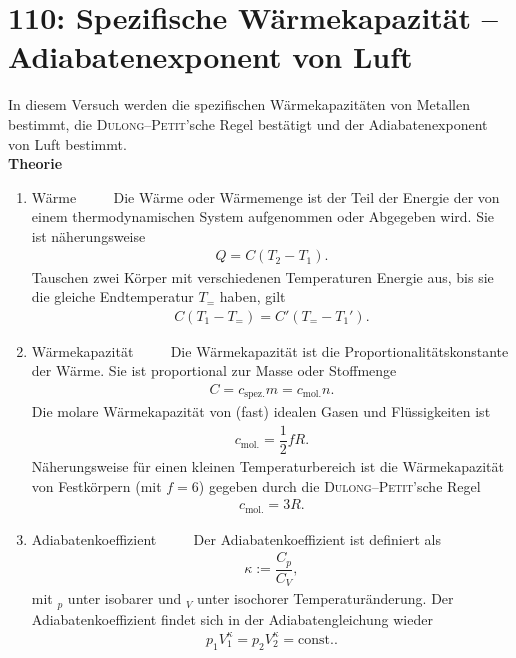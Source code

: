 \newpage
\section{110: Spezifische Wärmekapazität -- Adiabatenexponent von Luft}
In diesem Versuch werden die spezifischen Wärmekapazitäten von Metallen bestimmt, die \textsc{Dulong}--\textsc{Petit}'sche Regel bestätigt und der Adiabatenexponent von Luft bestimmt.\\
\textbf{Theorie} 
\begin{enumerate}[label=--]
        \item Wärme $\qquad $ 
                Die Wärme oder Wärmemenge ist der Teil der Energie der von einem thermodynamischen System aufgenommen oder Abgegeben wird.
                Sie ist näherungsweise
                \begin{align} 
                        Q=C\left(T_2-T_1\right)
                .\end{align} 
                Tauschen zwei Körper mit verschiedenen Temperaturen Energie aus, bis sie die gleiche Endtemperatur $T_=$ haben, gilt
                \begin{align} 
                        C\left(T_1-T_=\right)=C'\left(T_=-T_1'\right)
                .\end{align} 
        \item Wärmekapazität $\qquad $ 
                Die Wärmekapazität ist die Proportionalitätskonstante der Wärme.
                Sie ist proportional zur Masse oder Stoffmenge
                \begin{align} 
                        C=c _{\text{spez.}}m=c _{\text{mol.}}n
                .\end{align} 
                Die molare Wärmekapazität von (fast) idealen Gasen und Flüssigkeiten ist
                \begin{align} 
                        c _{\text{mol.}}=\dfrac{1}{2}fR
                .\end{align} 
                Näherungsweise für einen kleinen Temperaturbereich ist die Wärmekapazität von Festkörpern (mit $f=6$) gegeben durch die \textsc{Dulong}--\textsc{Petit}'sche Regel
                \begin{align} 
                        c _{\text{mol.}}=3R
                .\end{align} 
        \item Adiabatenkoeffizient $\qquad $ 
                Der Adiabatenkoeffizient ist definiert als 
                \begin{align} 
                        \kappa :=\dfrac{C_p}{C_V}
                ,\end{align} 
                mit ${}_p$ unter isobarer und ${}_V$ unter isochorer Temperaturänderung.
                Der Adiabatenkoeffizient findet sich in der Adiabatengleichung wieder
                \begin{align} 
                        p_1V_1^\kappa =p_2V_2^\kappa =\text{const.}
                .\end{align} 
\end{enumerate}
